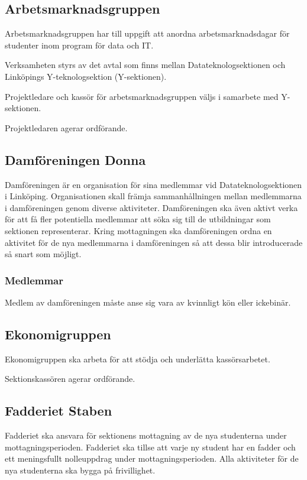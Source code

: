 \documentclass{datateknologsektionen-document}
\begin{document}
\subsection{Arbetsmarknadsgruppen}
\label{arbetsmarknadsgruppen}
Arbetsmarknadsgruppen har till uppgift att anordna arbetsmarknadsdagar för studenter
inom program för data och IT.

Verksamheten styrs av det avtal som finns mellan Datateknologsektionen och Linköpings
Y-teknologsektion (Y-sektionen).

Projektledare och kassör för arbetsmarknadsgruppen väljs i samarbete med Y-sektionen.

Projektledaren agerar ordförande.

\subsection{Damföreningen Donna}
Damföreningen är en organisation för sina medlemmar vid Datateknologsektionen i Linköping.
Organisationen skall främja sammanhållningen mellan medlemmarna i damföreningen genom
diverse aktiviteter. Damföreningen ska även aktivt verka för att få fler potentiella
medlemmar att söka sig till de utbildningar som sektionen representerar. Kring
mottagningen ska damföreningen ordna en aktivitet för de nya medlemmarna i damföreningen
så att dessa blir introducerade så snart som möjligt.

\subsubsection{Medlemmar}
Medlem av damföreningen måste anse sig vara av kvinnligt kön eller ickebinär.

\subsection{Ekonomigruppen}
Ekonomigruppen ska arbeta för att stödja och underlätta kassörsarbetet.

Sektionskassören agerar ordförande.

\subsection{Fadderiet Staben}
Fadderiet ska ansvara för sektionens mottagning av de nya studenterna under mottagningsperioden.
Fadderiet ska tillse att varje ny student har en fadder och ett meningsfullt nolleuppdrag
under mottagningsperioden. Alla aktiviteter för de nya studenterna ska bygga på frivillighet.
\end{document}
